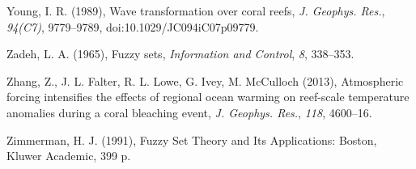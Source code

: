 \documentclass[default,jgrga]{agutex2015}
\begin{document}
\begin{article}
\begin{thebibliography}{}
Young, I. R. (1989), Wave transformation over coral reefs, \textit{J. Geophys. Res.}, \textit{94(C7)}, 9779--9789, doi:10.1029/JC094iC07p09779.

Zadeh, L. A. (1965), Fuzzy sets, \textit{Information and Control}, \textit{8}, 338--353.

Zhang, Z., J. L. Falter, R. L. Lowe, G. Ivey, M. McCulloch (2013), Atmospheric forcing intensifies the effects of regional ocean warming on reef-scale temperature anomalies during a coral bleaching event, \textit{J. Geophys. Res.}, \textit{118}, 4600–16.

Zimmerman, H. J. (1991), Fuzzy Set Theory and Its Applications: Boston, Kluwer Academic, 399 p.

%
%
%
%

\end{thebibliography}




\end{article}
\end{document}
